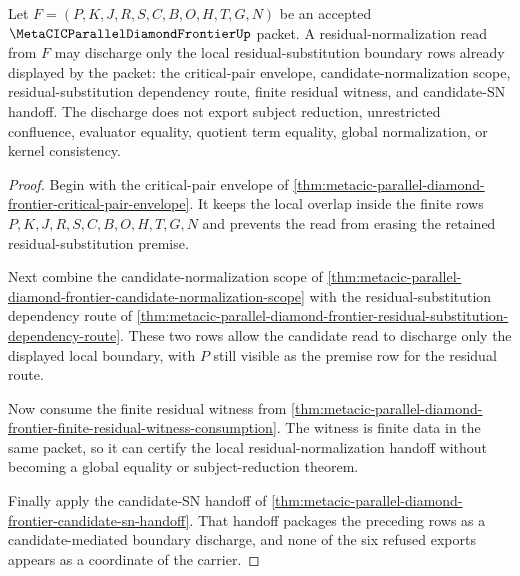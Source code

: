 \begin{theorem}
\label{thm:metacic-parallel-diamond-frontier-residual-substitution-discharge-boundary}
Let $F=(P,K,J,R,S,C,B,O,H,T,G,N)$ be an accepted $\MetaCICParallelDiamondFrontierUp$ packet. A residual-normalization read from $F$ may discharge only the local residual-substitution boundary rows already displayed by the packet: the critical-pair envelope, candidate-normalization scope, residual-substitution dependency route, finite residual witness, and candidate-SN handoff. The discharge does not export subject reduction, unrestricted confluence, evaluator equality, quotient term equality, global normalization, or kernel consistency.
\end{theorem}
\begin{proof}
Begin with the critical-pair envelope of \autoref{thm:metacic-parallel-diamond-frontier-critical-pair-envelope}. It keeps the local overlap inside the finite rows $P,K,J,R,S,C,B,O,H,T,G,N$ and prevents the read from erasing the retained residual-substitution premise.

Next combine the candidate-normalization scope of \autoref{thm:metacic-parallel-diamond-frontier-candidate-normalization-scope} with the residual-substitution dependency route of \autoref{thm:metacic-parallel-diamond-frontier-residual-substitution-dependency-route}. These two rows allow the candidate read to discharge only the displayed local boundary, with $P$ still visible as the premise row for the residual route.

Now consume the finite residual witness from \autoref{thm:metacic-parallel-diamond-frontier-finite-residual-witness-consumption}. The witness is finite data in the same packet, so it can certify the local residual-normalization handoff without becoming a global equality or subject-reduction theorem.

Finally apply the candidate-SN handoff of \autoref{thm:metacic-parallel-diamond-frontier-candidate-sn-handoff}. That handoff packages the preceding rows as a candidate-mediated boundary discharge, and none of the six refused exports appears as a coordinate of the carrier.
\end{proof}
